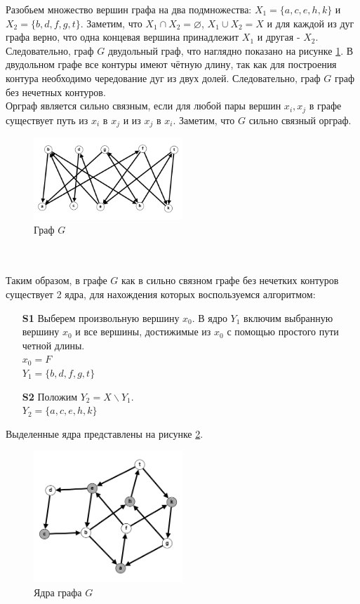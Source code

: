 \documentclass{article}
\begin{document}
\begin{enumerate}
Разобьем множество вершин графа на два подмножества: $X_1 = \{a, c, e, h, k\}$ и $X_2 = \{b,d,f,g,t\}$.
Заметим, что $X_1 \cap X_2 = \varnothing$, $X_1 \cup X_2 = X$ и для каждой из дуг графа верно, что одна концевая вершина принадлежит $X_1$ и другая - $X_2$. Следовательно, граф $G$ \quad\textemdash\quad двудольный граф, что наглядно показано на рисунке \ref{fig:5_bigraph}.
В двудольном графе все контуры имеют чётную длину, так как для построения контура необходимо чередование дуг из двух долей.
Следовательно, граф $G$ \quad\textemdash\quad граф без нечетных контуров.\\
Орграф является сильно связным, если для любой пары вершин $x_i,x_j$ в графе существует путь из $x_i$ в $x_j$ и из $x_j$ в $x_i$. Заметим, что $G$ \quad\textemdash\quad сильно связный орграф.
\begin{figure}[h]
    \centering
    \includegraphics[width=0.5\textwidth, center]{attachments/5/bigraph.png}
    \caption{Граф $G$}
    \label{fig:5_bigraph}
\end{figure}
\\
\\
Таким образом, в графе $G$ как в сильно связном графе без нечетких контуров существует 2 ядра, для нахождения которых воспользуемся алгоритмом:\\
\begin{enumerate}
    \item[\textbf{S1}] Выберем произвольную вершину $x_0$. В ядро $Y_1$ включим выбранную вершину $x_0$ и все вершины, достижимые из $x_0$ с помощью простого пути четной длины.\\
    $x_0 = F$\\$Y_1=\{b,d,f,g,t\}$
    \item[\textbf{S2}] Положим $Y_2 = X \backslash Y_1$.\\
    $Y_2 = \{a, c, e, h, k\}$
\end{enumerate}
Выделенные ядра представлены на рисунке \ref{fig:5_ys}.
\begin{figure}[h]
    \centering
    \includegraphics[width=0.5\textwidth, center]{attachments/5/res.png}
    \caption{Ядра графа $G$}
    \label{fig:5_ys}
\end{figure}
\end{enumerate}
\end{document}
